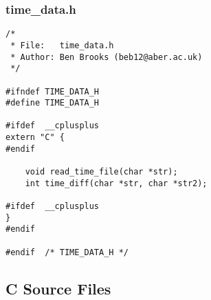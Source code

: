 \documentclass[pdftex,12pt,a4paper]{article}
\begin{document}
\subsubsection{time\_data.h}
\begin{verbatim}
/*
 * File:   time_data.h
 * Author: Ben Brooks (beb12@aber.ac.uk)
 */

#ifndef TIME_DATA_H
#define	TIME_DATA_H

#ifdef	__cplusplus
extern "C" {
#endif

    void read_time_file(char *str);
    int time_diff(char *str, char *str2);

#ifdef	__cplusplus
}
#endif

#endif	/* TIME_DATA_H */
\end{verbatim}
\subsection{C Source Files}
\end{document}
